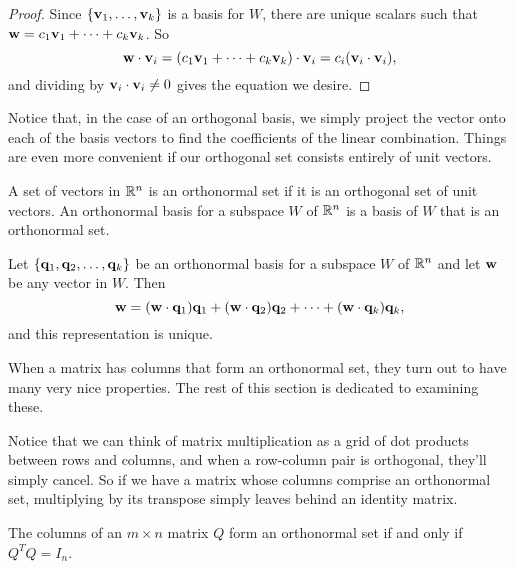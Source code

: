 \documentclass[../m073main.tex]{subfiles}
\begin{document}
\begin{proof}
	Since $\left\{ \mathbf{v}_1, \ldots, \mathbf{v}_k \right\}$ is a basis for $W$, there are unique scalars such that $\mathbf{w} = c_1 \mathbf{v}_1 + \cdots + c_k \mathbf{v}_k$.
	So
	\[ \mathbf{w} \cdot \mathbf{v}_i = (c_1 \mathbf{v}_1 + \cdots + c_k \mathbf{v}_k) \cdot \mathbf{v}_i = c_i (\mathbf{v}_i \cdot \mathbf{v}_i), \]
	and dividing by $\mathbf{v}_i \cdot \mathbf{v}_i \neq 0$ gives the equation we desire.
\end{proof}

Notice that, in the case of an orthogonal basis, we simply project the vector onto each of the basis vectors to find the coefficients of the linear combination.
Things are even more convenient if our orthogonal set consists entirely of unit vectors.

\begin{definition}
	A set of vectors in $\mathbb{R}^n$ is an orthonormal set if it is an orthogonal set of unit vectors.
	An orthonormal basis for a subspace $W$ of $\mathbb{R}^n$ is a basis of $W$ that is an orthonormal set.
\end{definition}

\begin{theorem}
	Let $\{\mathbf{q}_1, \mathbf{q}_2, \ldots, \mathbf{q}_k\}$ be an orthonormal basis for a subspace $W$ of $\mathbb{R}^n$ and let $\mathbf{w}$ be any vector in $W$.
	Then \vspace{-3pt}
	\[ \mathbf{w} = (\mathbf{w} \cdot \mathbf{q}_1) \mathbf{q}_1 + (\mathbf{w} \cdot \mathbf{q}_2) \mathbf{q}_2 + \cdots + (\mathbf{w} \cdot \mathbf{q}_k) \mathbf{q}_k,\]
	and this representation is unique.
\end{theorem}

When a matrix has columns that form an orthonormal set, they turn out to have many very nice properties.
The rest of this section is dedicated to examining these.

Notice that we can think of matrix multiplication as a grid of dot products between rows and columns, and when a row-column pair is orthogonal, they'll simply cancel.
So if we have a matrix whose columns comprise an orthonormal set, multiplying by its transpose simply leaves behind an identity matrix.

\begin{theorem}
	The columns of an $m \times n$ matrix $Q$ form an orthonormal set if and only if $Q^T Q = I_n$.
\end{theorem}
\end{document}
